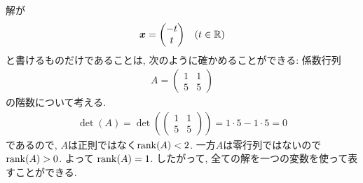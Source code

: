 \begin{checkanswer}%
  解が
  \begin{align*}
    \boldsymbol{x}=\begin{pmatrix}-t\\t\end{pmatrix} && (t\in\mathbb{R})
  \end{align*}
  と書けるものだけであることは,
  次のように確かめることができる:
  係数行列
  \begin{align*}
    A=\begin{pmatrix}1&1\\5&5\end{pmatrix}
  \end{align*}
  の階数について考える.
  \begin{align*}
    \det(A)=\det(\begin{pmatrix}1&1\\5&5\end{pmatrix})
      =1\cdot 5-1\cdot 5=0
  \end{align*}
  であるので, $A$は正則ではなく$\operatorname{rank}(A)<2$.
  一方$A$は零行列ではないので$\operatorname{rank}(A)>0$.
  よって
  $\operatorname{rank}(A)=1$.
  したがって, 全ての解を一つの変数を使って表すことができる.
\end{checkanswer}

